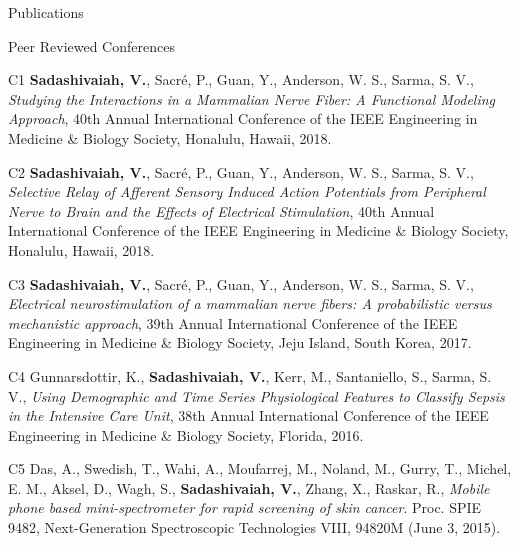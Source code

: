 \documentclass{resume}
\begin{document}
\begin{rSection}{Publications}
\begin{rSubsection}{Peer Reviewed Conferences}{}{}{}
\item [C1] \textbf{Sadashivaiah, V.}, Sacré, P., Guan, Y., Anderson, W. S., Sarma, S. V., \textit{Studying the Interactions in a Mammalian Nerve Fiber: A Functional Modeling Approach}, 40th Annual International Conference of the IEEE Engineering in Medicine \& Biology Society, Honalulu, Hawaii, 2018.\newline
\item [C2] \textbf{Sadashivaiah, V.}, Sacré, P., Guan, Y., Anderson, W. S., Sarma, S. V., \textit{Selective Relay of Afferent Sensory Induced Action Potentials from Peripheral Nerve to Brain and the Effects of Electrical Stimulation}, 40th Annual International Conference of the IEEE Engineering in Medicine \& Biology Society, Honalulu, Hawaii, 2018.\newline
\item [C3] \textbf{Sadashivaiah, V.}, Sacré, P., Guan, Y., Anderson, W. S., Sarma, S. V., \textit{Electrical neurostimulation of a mammalian nerve fibers: A probabilistic versus mechanistic approach}, 39th Annual International Conference of the IEEE Engineering in Medicine \& Biology Society, Jeju Island, South Korea, 2017.\newline
\item [C4] Gunnarsdottir, K., \textbf{Sadashivaiah, V.}, Kerr, M., Santaniello, S., Sarma, S. V., \textit{Using Demographic and Time Series Physiological Features to Classify Sepsis in the Intensive Care Unit}, 38th Annual International Conference of the IEEE Engineering in Medicine \& Biology Society, Florida, 2016.\newline
\item [C5] Das, A., Swedish, T., Wahi, A., Moufarrej, M., Noland, M., Gurry, T., Michel, E. M., Aksel, D., Wagh, S., \textbf{Sadashivaiah, V.}, Zhang, X., Raskar, R., \textit{Mobile phone based mini-spectrometer for rapid screening of skin cancer}. Proc. SPIE 9482, Next-Generation Spectroscopic Technologies VIII, 94820M (June 3, 2015).
\end{rSubsection}


\end{rSection}
\end{document}
